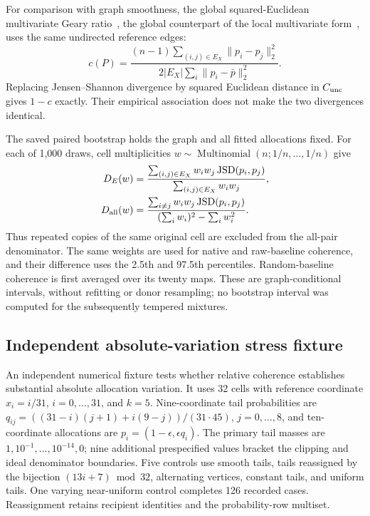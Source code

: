 \documentclass[11pt]{article}
\begin{document}
For comparison with graph smoothness, the global squared-Euclidean multivariate Geary ratio~\cite{geary1954contiguity}, the global counterpart of the local multivariate form~\cite{anselin2019local}, uses the same undirected reference edges:
\begin{equation}
 c(P)=\frac{(n-1)\sum_{(i,j)\in E_X}\lVert p_i-p_j\rVert_2^2}
 {2|E_X|\sum_i\lVert p_i-\bar p\rVert_2^2}.
\end{equation}
Replacing Jensen--Shannon divergence by squared Euclidean distance in $C_{\rm unc}$ gives $1-c$ exactly. Their empirical association does not make the two divergences identical.

The saved paired bootstrap holds the graph and all fitted allocations fixed. For each of 1,000 draws, cell multiplicities $w\sim\operatorname{Multinomial}(n;1/n,\ldots,1/n)$ give
\begin{align}
 D_E(w)&=\frac{\sum_{(i,j)\in E_X}w_iw_j\operatorname{JSD}(p_i,p_j)}{\sum_{(i,j)\in E_X}w_iw_j},\\
 D_{\rm all}(w)&=\frac{\sum_{i\ne j}w_iw_j\operatorname{JSD}(p_i,p_j)}{(\sum_iw_i)^2-\sum_iw_i^2}.
\end{align}
Thus repeated copies of the same original cell are excluded from the all-pair denominator. The same weights are used for native and raw-baseline coherence, and their difference uses the 2.5th and 97.5th percentiles. Random-baseline coherence is first averaged over its twenty maps. These are graph-conditional intervals, without refitting or donor resampling; no bootstrap interval was computed for the subsequently tempered mixtures.

\subsection{Independent absolute-variation stress fixture}

An independent numerical fixture tests whether relative coherence establishes substantial absolute allocation variation. It uses 32 cells with reference coordinate $x_i=i/31$, $i=0,\ldots,31$, and $k=5$. Nine-coordinate tail probabilities are $q_{ij}=((31-i)(j+1)+i(9-j))/(31\cdot45)$, $j=0,\ldots,8$, and ten-coordinate allocations are $p_i=(1-\epsilon,\epsilon q_i)$. The primary tail masses are $1,10^{-1},\ldots,10^{-14},0$; nine additional prespecified values bracket the clipping and ideal denominator boundaries. Five controls use smooth tails, tails reassigned by the bijection $(13i+7)\bmod32$, alternating vertices, constant tails, and uniform tails. One varying near-uniform control completes 126 recorded cases. Reassignment retains recipient identities and the probability-row multiset.
\end{document}

